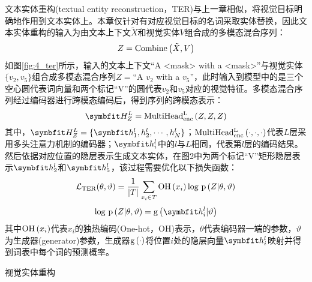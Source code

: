 
文本实体重构(textual entity reconstruction，TER)与上一章相似，将视觉目标明确地作用到文本实体上。本章仅针对有对应视觉目标的名词采取实体替换，因此文本实体重构的输入为由文本上下文$\tilde{X}$和视觉实体$V$组合成的多模态混合序列：
\begin{equation}
Z={\rm{Combine}} \left( \tilde{X}, V \right)
\end{equation}
如图\ref{fig:4_ter}所示，输入的文本上下文“A <mask> with a <mask>”与视觉实体$\{v_2,v_5\}$组合成多模态混合序列$Z=$“A $v_2$ with a $v_5$”，此时输入到模型中的是三个空心圆代表词向量和两个标记“V”的圆代表$v_2$和$v_5$对应的视觉特征。多模态混合序列经过编码器进行跨模态编码后，得到序列的跨模态表示：
\begin{equation}
\Vector{H_Z^L}={\rm{MultiHead_{enc}^L}} \left( Z, Z, Z \right)
\end{equation}
其中，$\Vector{H_Z^L}=\{\Vector{h_1^l,h_2^l,\cdots,h_N^l}\}$；${\rm{MultiHead_{enc}^L}} \left( \cdot,\cdot,\cdot \right)$代表$L$层采用多头注意力机制的编码器；$\Vector{h_i^l}$中的$l$与$L$相同，代表第$l$层的编码结果。然后依据对应位置的隐层表示生成文本实体，在图2中为两个标记“V”矩形隐层表示${\Vector{h_2^l}}$和${\Vector{h_5^l}}$，该过程需要优化以下损失函数：
\begin{equation}
\mathcal{L}_{\rm{TER}} (\theta, \vartheta) =
    \frac{1}{{\vert}T{\vert}}
    \mathop{\sum}_{x_i \in T}
    {\rm{OH}} \left( x_i \right)
    {\rm log}{\ }{\rm p} \left( Z {\vert} \theta, \vartheta \right)
\end{equation}
\begin{equation}
{\log}{\ }{\rm p} \left( Z {\vert} \theta, \vartheta \right) =
    {\rm{g}} \left( \Vector{h_i^l} \vert \vartheta \right)
\end{equation}
其中${\rm{OH}}\left(x_i\right)$代表$x_i$的独热编码(One-hot，OH)表示，$\theta$代表编码器一端的参数，$\vartheta$为生成器(generator)参数，生成器${\rm{g}}\left(\cdot\right)$将位置$i$处的隐层向量${\Vector{h_i^l}}$映射并得到词表中每个词的预测概率。

{\sffamily 视觉实体重构}

